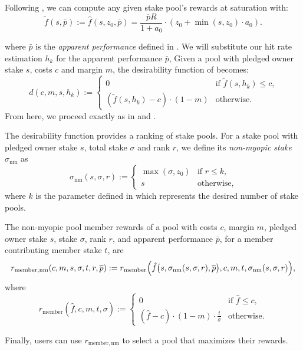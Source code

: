 \documentclass[11pt,a4paper,dvipsnames,twosided]{article}
\newcommand\pbar{\overline{p}}
\begin{document}
Following \cite[Section 5.6.1]{delegation_design},
we can compute any given stake pool's rewards at saturation with:
\[
    \tilde{f}(s, \pbar) :=
    \hat{f}(s,z_0,\pbar)=
    \frac{\pbar R}{1 + a_0}
    \cdot
    \left(z_0 + \min(s,z_0)\cdot a_0\right).
\]

where $\bar{p}$ is the \textit{apparent performance} defined in
\cite[Section 5.5.2]{delegation_design}.
We will substitute our hit rate estimation $h_k$ for the apparent performance $\bar{p}$,
Given a pool with pledged owner stake \(s\), costs \(c\) and margin \(m\),
the desirability function of \cite[Section 5.6.1]{delegation_design} becomes:
\[
    d(c, m, s, h_k) :=
    \left\{
    \begin{array}{ll}
        \displaystyle 0 &
        \text{if $\tilde{f}(s,h_k)\leq c$,} \\
        \displaystyle\left(\tilde{f}(s,h_k) - c\right)\cdot(1-m) &
        \text{otherwise.}
    \end{array}
    \right.
\]
From here, we proceed exactly as in
\cite[Section 5.6.2]{delegation_design} and
\cite[Section 5.6.4]{delegation_design}.

The desirability function provides a ranking of stake pools.
For a stake pool with pledged owner stake $s$, total stake $\sigma$ and rank
$r$, we define its \emph{non-myopic stake} $\sigma_\mathrm{nm}$ as
\[
    \sigma_\mathrm{nm}(s,\sigma,r) :=
    \left\{
    \begin{array}{ll}
        \max(\sigma,z_0) &
        \text{if $r\leq k$,} \\
        s &
        \text{otherwise,}
    \end{array}
    \right.
\]
where $k$ is the parameter defined in \cite[Section 5.2]{delegation_design}
which represents the desired number of stake pools.

The non-myopic pool member rewards of a pool with costs $c$, margin $m$,
pledged owner stake $s$, stake $\sigma$, rank $r$, and apparent
performance $\pbar$, for a member contributing member stake $t$, are
\[
    r_\mathrm{member, nm}(c, m, s, \sigma, t, r, \pbar) :=
    r_\mathrm{member}\Bigl(\hat{f}\bigl(s,\sigma_\mathrm{nm}(s,\sigma, r),
    \pbar\bigr),
    c, m, t, \sigma_\mathrm{nm}(s,\sigma,r)\Bigr),
\label{eq:non-myopic-member-rewards}
\]
where
\[
    r_\mathrm{member}(\hat{f}, c, m, t, \sigma) :=
    \left\{
    \begin{array}{ll}
        \displaystyle 0 &
        \text{if $\hat{f}\leq c$,} \\
        \displaystyle (\hat{f} - c)\cdot(1-m)\cdot\frac{t}{\sigma} &
        \text{otherwise.}
    \end{array}
    \right.
\]

Finally, users can use $r_\mathrm{member, nm}$ to select a pool
that maximizes their rewards.



\end{document}
